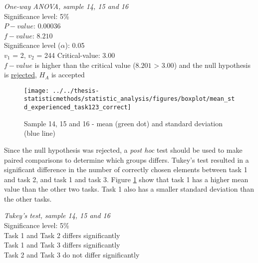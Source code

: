 \begin{center}
	\begin{tcolorbox}[box align=center,width=\textwidth-5cm]
		\centering
		\textit{One-way \textit{ANOVA}, sample 14, 15 and 16}\\
		Significance level: 5\%  \\[0.5cm]
		
		$P-value$: $0.00036$ \\
		$f-value$: $8.210$ \\
		Significance level ($\alpha$): 0.05 \\
		$v_1$ = 2, $v_2$ = 244 %
		Critical-value: 3.00 \\[0.2cm] %
		
		$f-value$ is higher than the critical value ($8.201$ > $3.00$) and the null hypothesis is \underline{rejected}, $H_A$ is accepted\\[0.5cm]
	\end{tcolorbox} 
\end{center}

\begin{figure}[h]
	\centering
	\texttt{[image: ../../thesis-statisticmethods/statistic\_analysis/figures/boxplot/mean\_std\_experienced\_task123\_correct]}
	\caption{Sample 14, 15 and 16 - mean (green dot) and standard deviation (blue line)}
	\label{fig:meanstdexperiencedtask123correct}
\end{figure}

Since the null hypothesis was rejected, a \textit{post hoc} test should be used to make paired comparisons to determine which groups differs. Tukey's test resulted in a significant difference in the number of correctly chosen elements between task 1 and task 2, and task 1 and task 3. Figure \ref{fig:meanstdexperiencedtask123correct} show that task 1 has a higher mean value than the other two tasks. Task 1 also has a smaller standard deviation than the other tasks. 

 \begin{center}
	\begin{tcolorbox}[box align=center,width=\textwidth-5cm]
		\centering
		\textit{Tukey's test, sample 14, 15 and 16}\\
		Significance level: 5\%  \\[0.5cm]
		
		Task 1 and Task 2 differs significantly \\
		Task 1 and Task 3 differs significantly \\
		Task 2 and Task 3 do not differ significantly \\[0.2cm]
	\end{tcolorbox} 
\end{center}

